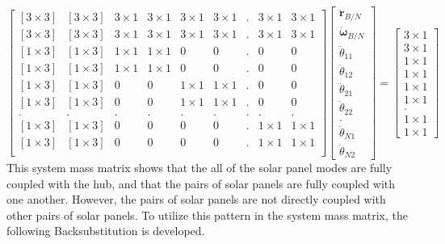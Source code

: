 \begin{equation}
	\begin{bmatrix}
		[3\times 3] & [3\times 3] & 3\times 1 & 3\times 1 & 3\times 1 & 3\times 1 & . & 3\times 1 & 3\times 1\\
		[3\times 3] & [3\times 3] & 3\times 1 & 3\times 1 & 3\times 1 & 3\times 1 & . & 3\times 1 & 3\times 1\\
		[1\times 3] & [1\times 3] & 1\times 1 & 1\times 1  & 0 & 0 & . & 0 & 0\\
		[1\times 3] & [1\times 3] & 1\times 1 & 1\times 1  & 0 & 0 & . & 0 & 0\\
		[1\times 3] & [1\times 3] & 0 & 0  & 1\times 1 & 1\times 1 & . & 0 & 0 \\
		[1\times 3] & [1\times 3] & 0 & 0  & 1\times 1 & 1\times 1 & . & 0 & 0\\
		. & . & . & . & . & . & . & . & .\\
		[1\times 3] & [1\times 3] & 0 & 0  & 0 & 0 & . & 1\times 1 & 1\times 1\\
		[1\times 3] & [1\times 3] & 0 & 0  & 0 & 0 & . & 1\times 1 & 1\times 1\\
	\end{bmatrix}
	\begin{bmatrix}
		\ddot{\boldsymbol{r}}_{B/N}\\
		\dot{\boldsymbol{\omega}}_{B/N}\\
		\ddot{\theta}_{11}\\
		\ddot{\theta}_{12}\\
		\ddot{\theta}_{21}\\
		\ddot{\theta}_{22}\\
		.\\
		\ddot{\theta}_{N1}\\
		\ddot{\theta}_{N2}
	\end{bmatrix}
	=
	\begin{bmatrix}
		3\times 1\\
		3\times 1\\
		1\times 1\\
		1\times 1\\
		1\times 1\\
		1\times 1\\
		.\\
		1\times 1\\
		1\times 1
	\end{bmatrix}
\end{equation}
This system mass matrix shows that the all of the solar panel modes are fully coupled with the hub, and that the pairs of solar panels are fully coupled with one another. However, the pairs of solar panels are not directly coupled with other pairs of solar panels. To utilize this pattern in the system mass matrix, the following Backsubstitution is developed.


